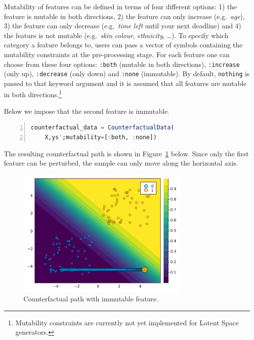 \documentclass{juliacon}
\begin{document}
Mutability of features can be defined in terms of four different
options: 1) the feature is mutable in both directions, 2) the feature
can only increase (e.g.~\emph{age}), 3) the feature can only decrease
(e.g.~\emph{time left} until your next deadline) and 4) the feature is
not mutable (e.g.~\emph{skin colour}, \emph{ethnicity}, \ldots). To
specify which category a feature belongs to, users can pass a vector of
symbols containing the mutability constraints at the pre-processing
stage. For each feature one can choose from these four options:
\texttt{:both} (mutable in both directions), \texttt{:increase} (only
up), \texttt{:decrease} (only down) and \texttt{:none} (immutable). By
default, \texttt{nothing} is passed to that keyword argument and it is
assumed that all features are mutable in both directions.\footnote{Mutability
  constraints are currently not yet implemented for Latent Space
  generators.}

Below we impose that the second feature is immutable.

\begin{lstlisting}[language=Julia, escapechar=@, numbers=left, label={lst:mutability}, caption={}]
counterfactual_data = CounterfactualData(
    X,ys';mutability=[:both, :none])
\end{lstlisting}

The resulting counterfactual path is shown in
Figure~\ref{fig-mutability} below. Since only the first feature can be
perturbed, the sample can only move along the horizontal axis.

\begin{figure}

{\centering \includegraphics[width=3.33333in,height=2.5in]{www/constraint_mutability.png}

}

\caption{\label{fig-mutability}Counterfactual path with immutable
feature.}

\end{figure}
\end{document}
